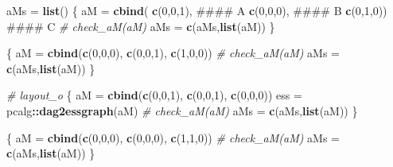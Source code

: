 \documentclass[]{article}
\newenvironment{Shaded}{\begin{snugshade}}{\end{snugshade}}
\newcommand{\KeywordTok}[1]{\textcolor[rgb]{0.13,0.29,0.53}{\textbf{#1}}}
\newcommand{\DecValTok}[1]{\textcolor[rgb]{0.00,0.00,0.81}{#1}}
\newcommand{\StringTok}[1]{\textcolor[rgb]{0.31,0.60,0.02}{#1}}
\newcommand{\CommentTok}[1]{\textcolor[rgb]{0.56,0.35,0.01}{\textit{#1}}}
\newcommand{\OperatorTok}[1]{\textcolor[rgb]{0.81,0.36,0.00}{\textbf{#1}}}
\newcommand{\NormalTok}[1]{#1}
\theoremstyle{definition}
\theoremstyle{definition}
\theoremstyle{definition}
\theoremstyle{remark}
\begin{document}
\begin{Shaded}
\begin{Highlighting}[]
\NormalTok{aMs =}\StringTok{ }\KeywordTok{list}\NormalTok{()}
\NormalTok{\{}
\NormalTok{  aM =}\StringTok{ }\KeywordTok{cbind}\NormalTok{(}
    \KeywordTok{c}\NormalTok{(}\DecValTok{0}\NormalTok{,}\DecValTok{0}\NormalTok{,}\DecValTok{1}\NormalTok{),  #### A}
    \KeywordTok{c}\NormalTok{(}\DecValTok{0}\NormalTok{,}\DecValTok{0}\NormalTok{,}\DecValTok{0}\NormalTok{),  #### B}
    \KeywordTok{c}\NormalTok{(}\DecValTok{0}\NormalTok{,}\DecValTok{1}\NormalTok{,}\DecValTok{0}\NormalTok{))  #### C}
  \CommentTok{# check_aM(aM)}
\NormalTok{  aMs =}\StringTok{ }\KeywordTok{c}\NormalTok{(aMs,}\KeywordTok{list}\NormalTok{(aM))}
\NormalTok{\}}

\NormalTok{\{}
\NormalTok{  aM =}\StringTok{ }\KeywordTok{cbind}\NormalTok{(}\KeywordTok{c}\NormalTok{(}\DecValTok{0}\NormalTok{,}\DecValTok{0}\NormalTok{,}\DecValTok{0}\NormalTok{),}
             \KeywordTok{c}\NormalTok{(}\DecValTok{0}\NormalTok{,}\DecValTok{0}\NormalTok{,}\DecValTok{1}\NormalTok{),}
             \KeywordTok{c}\NormalTok{(}\DecValTok{1}\NormalTok{,}\DecValTok{0}\NormalTok{,}\DecValTok{0}\NormalTok{))}
  \CommentTok{# check_aM(aM)}
\NormalTok{  aMs =}\StringTok{ }\KeywordTok{c}\NormalTok{(aMs,}\KeywordTok{list}\NormalTok{(aM))}
\NormalTok{\}}

\CommentTok{# layout_o}
\NormalTok{\{}
\NormalTok{  aM =}\StringTok{ }\KeywordTok{cbind}\NormalTok{(}\KeywordTok{c}\NormalTok{(}\DecValTok{0}\NormalTok{,}\DecValTok{0}\NormalTok{,}\DecValTok{1}\NormalTok{),}
             \KeywordTok{c}\NormalTok{(}\DecValTok{0}\NormalTok{,}\DecValTok{0}\NormalTok{,}\DecValTok{1}\NormalTok{),}
             \KeywordTok{c}\NormalTok{(}\DecValTok{0}\NormalTok{,}\DecValTok{0}\NormalTok{,}\DecValTok{0}\NormalTok{))}
\NormalTok{  ess =}\StringTok{ }\NormalTok{pcalg}\OperatorTok{::}\KeywordTok{dag2essgraph}\NormalTok{(aM)}
  \CommentTok{# check_aM(aM)}
\NormalTok{  aMs =}\StringTok{ }\KeywordTok{c}\NormalTok{(aMs,}\KeywordTok{list}\NormalTok{(aM))}
\NormalTok{\}}

\NormalTok{\{}
\NormalTok{  aM =}\StringTok{ }\KeywordTok{cbind}\NormalTok{(}\KeywordTok{c}\NormalTok{(}\DecValTok{0}\NormalTok{,}\DecValTok{0}\NormalTok{,}\DecValTok{0}\NormalTok{),}
             \KeywordTok{c}\NormalTok{(}\DecValTok{0}\NormalTok{,}\DecValTok{0}\NormalTok{,}\DecValTok{0}\NormalTok{),}
             \KeywordTok{c}\NormalTok{(}\DecValTok{1}\NormalTok{,}\DecValTok{1}\NormalTok{,}\DecValTok{0}\NormalTok{))}
  \CommentTok{# check_aM(aM)}
\NormalTok{  aMs =}\StringTok{ }\KeywordTok{c}\NormalTok{(aMs,}\KeywordTok{list}\NormalTok{(aM))}
\NormalTok{\}}
\end{Highlighting}
\end{Shaded}
\end{document}
